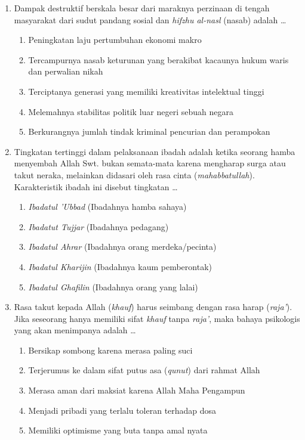 \documentclass[12pt,a4paper]{article}
\begin{document}
\begin{enumerate}[leftmargin=*]
\item Dampak destruktif berskala besar dari maraknya perzinaan di tengah masyarakat dari sudut pandang sosial dan \textit{hifzhu al-nasl} (nasab) adalah \dots
    \begin{enumerate}[label=\alph*.]
        \item Peningkatan laju pertumbuhan ekonomi makro
        \item Tercampurnya nasab keturunan yang berakibat kacaunya hukum waris dan perwalian nikah
        \item Terciptanya generasi yang memiliki kreativitas intelektual tinggi
        \item Melemahnya stabilitas politik luar negeri sebuah negara
        \item Berkurangnya jumlah tindak kriminal pencurian dan perampokan
    \end{enumerate}

\item Tingkatan tertinggi dalam pelaksanaan ibadah adalah ketika seorang hamba menyembah Allah Swt. bukan semata-mata karena mengharap surga atau takut neraka, melainkan didasari oleh rasa cinta (\textit{mahabbatullah}). Karakteristik ibadah ini disebut tingkatan \dots
    \begin{enumerate}[label=\alph*.]
        \item \textit{Ibadatul 'Ubbad} (Ibadahnya hamba sahaya)
        \item \textit{Ibadatut Tujjar} (Ibadahnya pedagang)
        \item \textit{Ibadatul Ahrar} (Ibadahnya orang merdeka/pecinta)
        \item \textit{Ibadatul Kharijin} (Ibadahnya kaum pemberontak)
        \item \textit{Ibadatul Ghafilin} (Ibadahnya orang yang lalai)
    \end{enumerate}

\item Rasa takut kepada Allah (\textit{khauf}) harus seimbang dengan rasa harap (\textit{raja'}). Jika seseorang hanya memiliki sifat \textit{khauf} tanpa \textit{raja'}, maka bahaya psikologis yang akan menimpanya adalah \dots
    \begin{enumerate}[label=\alph*.]
        \item Bersikap sombong karena merasa paling suci
        \item Terjerumus ke dalam sifat putus asa (\textit{qunut}) dari rahmat Allah
        \item Merasa aman dari maksiat karena Allah Maha Pengampun
        \item Menjadi pribadi yang terlalu toleran terhadap dosa
        \item Memiliki optimisme yang buta tanpa amal nyata
    \end{enumerate}


\end{enumerate}
\end{document}
